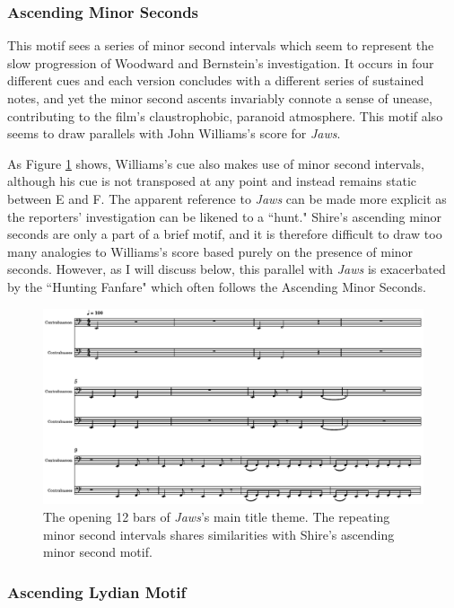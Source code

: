 \subsubsection{Ascending Minor Seconds}

This motif sees a series of minor second intervals which seem to represent the slow progression of Woodward and Bernstein's investigation.
It occurs in four different cues and each version concludes with a different series of sustained notes, and yet the minor second ascents invariably connote a sense of unease, contributing to the film's claustrophobic, paranoid atmosphere.
This motif also seems to draw parallels with John Williams's score for \textit{Jaws}.

As Figure \ref{fig:president-jaws-intro} shows, Williams's cue also makes use of minor second intervals, although his cue is not transposed at any point and instead remains static between E and F.
The apparent reference to \textit{Jaws} can be made more explicit as the reporters' investigation can be likened to a ``hunt."
Shire's ascending minor seconds are only a part of a brief motif, and it is therefore difficult to draw too many analogies to Williams's score based purely on the presence of minor seconds.
However, as I will discuss below, this parallel with \textit{Jaws} is exacerbated by the ``Hunting Fanfare" which often follows the Ascending Minor Seconds.
\begin{figure}
    \centering
    \includegraphics[width=1\linewidth]{img/president-jaws-intro.pdf}
    \caption{The opening 12 bars of \textit{Jaws}'s main title theme. The repeating minor second intervals shares similarities with Shire's ascending minor second motif.}
    \label{fig:president-jaws-intro}
\end{figure}

\subsubsection{Ascending Lydian Motif}

